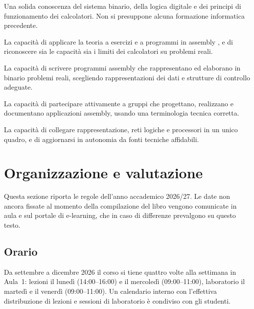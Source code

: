 \begin{description}[style=nextline,leftmargin=1.5em]
\item[Conoscenza e capacità di comprensione.] Una solida conoscenza del sistema
  binario, della logica digitale e dei principi di funzionamento dei
  calcolatori. Non si presuppone alcuna formazione informatica precedente.
\item[Capacità di applicare conoscenza e comprensione.] La capacità di
  applicare la teoria a esercizi e a programmi in assembly \riscv, e di
  riconoscere sia le capacità sia i limiti dei calcolatori su problemi reali.
\item[Autonomia di giudizio.] La capacità di scrivere programmi assembly che
  rappresentano ed elaborano in binario problemi reali, scegliendo
  rappresentazioni dei dati e strutture di controllo adeguate.
\item[Abilità comunicative.] La capacità di partecipare attivamente a gruppi
  che progettano, realizzano e documentano applicazioni assembly, usando una
  terminologia tecnica corretta.
\item[Capacità di apprendimento.] La capacità di collegare rappresentazione,
  reti logiche e processori in un unico quadro, e di aggiornarsi in autonomia
  da fonti tecniche affidabili.
\end{description}

\section{Organizzazione e valutazione}

Questa sezione riporta le regole dell'anno accademico 2026/27. Le date non
ancora fissate al momento della compilazione del libro vengono comunicate in
aula e sul portale di e-learning, che in caso di differenze prevalgono su
questo testo.

\subsection{Orario}

Da settembre a dicembre 2026 il corso si tiene quattro volte alla settimana in
Aula~1: lezioni il lunedì (14:00--16:00) e il mercoledì (09:00--11:00),
laboratorio il martedì e il venerdì (09:00--11:00). Un calendario interno con
l'effettiva distribuzione di lezioni e sessioni di laboratorio è condiviso con
gli studenti.

